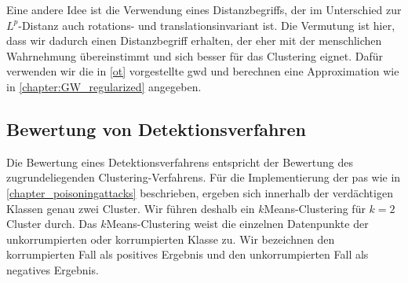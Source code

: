 \documentclass[twoside, 12pt,a4paper]{book}
\numberwithin{equation}{section}
\begin{document}
	\noindent Eine andere Idee ist die Verwendung eines Distanzbegriffs, der im Unterschied zur $L^p$-Distanz auch rotations- und translationsinvariant ist. Die Vermutung ist hier, dass wir dadurch einen Distanzbegriff erhalten, der eher mit der menschlichen Wahrnehmung übereinstimmt und sich besser für das Clustering eignet. Dafür verwenden wir die in \autoref{ot} vorgestellte \ac{gwd} und berechnen eine Approximation wie in  \autoref{chapter:GW_regularized} angegeben.
	  
	

	

	
	
	
	\subsection{Bewertung von Detektionsverfahren}\label{chapter:detectionevaluation}
	
	Die Bewertung eines Detektionsverfahrens entspricht der Bewertung des zugrundeliegenden Clustering-Verfahrens.
	Für die Implementierung der \acp{pa} wie in \autoref{chapter_poisoningattacks} beschrieben, ergeben sich innerhalb der verdächtigen Klassen genau zwei Cluster. Wir führen deshalb ein $k$Means-Clustering für $k=2$ Cluster durch. Das $k$Means-Clustering weist die einzelnen Datenpunkte der unkorrumpierten oder korrumpierten Klasse zu. Wir bezeichnen den korrumpierten Fall als positives Ergebnis und den unkorrumpierten Fall als negatives Ergebnis.\\
	
\end{document}
